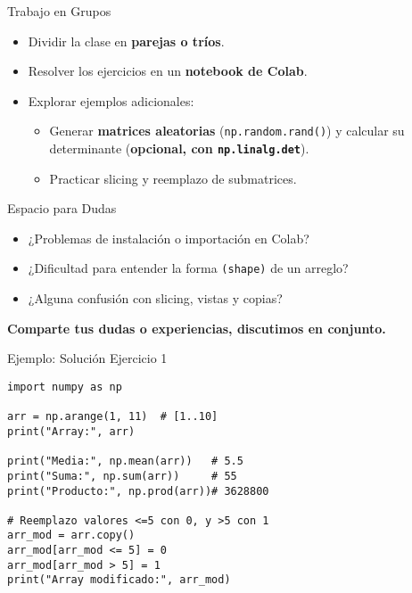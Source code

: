 \documentclass[10pt]{beamer}
\begin{document}
\begin{frame}{Trabajo en Grupos}
  \begin{itemize}
    \item Dividir la clase en \textbf{parejas o tríos}.
    \item Resolver los ejercicios en un \textbf{notebook de Colab}.
    \item Explorar ejemplos adicionales: 
      \begin{itemize}
        \item Generar \textbf{matrices aleatorias} (\texttt{np.random.rand()}) y calcular su determinante (\textbf{opcional, con \texttt{np.linalg.det}}).
        \item Practicar slicing y reemplazo de submatrices.
      \end{itemize}
  \end{itemize}
\end{frame}

\begin{frame}{Espacio para Dudas}
  \begin{itemize}
    \item ¿Problemas de instalación o importación en Colab?
    \item ¿Dificultad para entender la forma \texttt{(shape)} de un arreglo?
    \item ¿Alguna confusión con slicing, vistas y copias?
  \end{itemize}
  \vspace{0.3cm}
  \textbf{Comparte tus dudas o experiencias, discutimos en conjunto.}
\end{frame}

\begin{frame}[fragile]{Ejemplo: Solución Ejercicio 1}
\begin{verbatim}
import numpy as np

arr = np.arange(1, 11)  # [1..10]
print("Array:", arr)

print("Media:", np.mean(arr))   # 5.5
print("Suma:", np.sum(arr))     # 55
print("Producto:", np.prod(arr))# 3628800

# Reemplazo valores <=5 con 0, y >5 con 1
arr_mod = arr.copy()
arr_mod[arr_mod <= 5] = 0
arr_mod[arr_mod > 5] = 1
print("Array modificado:", arr_mod)
\end{verbatim}
\end{frame}
\end{document}
